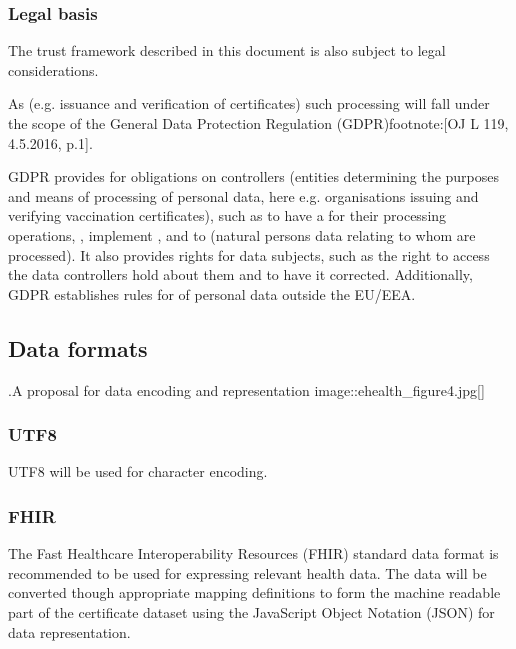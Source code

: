 \documentclass[a4paper,12pt,english]{sphinxhowto}
\begin{document}
\subsubsection{Legal basis}
\label{\detokenize{ssi/annotehealth:legal-basis}}
\sphinxAtStartPar
The trust framework described in this document is also subject to legal considerations.

\sphinxAtStartPar
As  (e.g. issuance and verification of certificates) such processing will fall under the scope of the General Data Protection Regulation (GDPR)footnote:{[}OJ L 119, 4.5.2016, p.1{]}.

\sphinxAtStartPar
GDPR provides for obligations on controllers (entities determining the purposes and means of processing of personal data, here e.g. organisations issuing and verifying vaccination certificates), such as to have a  for their processing operations, , implement , and to  (natural persons data relating to whom are processed). It also provides rights for data subjects, such as the right to access the data controllers hold about them and to have it corrected. Additionally, GDPR establishes rules for  of personal data outside the EU/EEA.


\subsection{Data formats}
\label{\detokenize{ssi/annotehealth:data-formats}}
\sphinxAtStartPar
.A proposal for data encoding and representation
image::ehealth\_figure4.jpg{[}{]}


\subsubsection{UTF\sphinxhyphen{}8}
\label{\detokenize{ssi/annotehealth:utf-8}}
\sphinxAtStartPar
UTF\sphinxhyphen{}8 will be used for character encoding.


\subsubsection{FHIR}
\label{\detokenize{ssi/annotehealth:fhir}}
\sphinxAtStartPar
The Fast Healthcare Interoperability Resources (FHIR) standard data format is recommended to be used for expressing relevant health data. The data will be converted though appropriate mapping definitions to form the machine readable part of the certificate dataset using the JavaScript Object Notation (JSON) for data representation.
\end{document}
